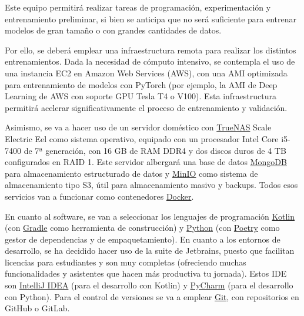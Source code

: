 Este equipo permitirá realizar tareas de programación, experimentación y entrenamiento preliminar, si bien se anticipa que no será suficiente para entrenar modelos de gran tamaño o con grandes cantidades de datos.

Por ello, se deberá emplear una infraestructura remota para realizar los distintos entrenamientos. Dada la necesidad de cómputo intensivo, se contempla el uso de una instancia EC2 en Amazon Web Services (AWS), con una AMI optimizada para entrenamiento de modelos con PyTorch (por ejemplo, la AMI de Deep Learning de AWS con soporte GPU Tesla T4 o V100). Esta infraestructura permitirá acelerar significativamente el proceso de entrenamiento y validación.

Asimismo, se va a hacer uso de un servidor doméstico con \href{https://www.truenas.com/}{TrueNAS} Scale Electric Eel como sistema operativo, equipado con un procesador Intel Core i5-7400 de 7ª generación, con 16 GB de RAM DDR4 y dos discos duros de 4 TB configurados en RAID 1. Este servidor albergará una base de datos \href{https://www.mongodb.com/}{MongoDB} para almacenamiento estructurado de datos y \href{https://min.io/}{MinIO} como sistema de almacenamiento tipo S3, útil para almacenamiento masivo y backups. Todos esos servicios van a funcionar como contenedores \href{https://www.docker.com/}{Docker}.

En cuanto al software, se van a seleccionar los lenguajes de programación \href{https://kotlinlang.org/}{Kotlin} (con \href{https://gradle.org/}{Gradle} como herramienta de construcción) y \href{https://www.python.org/}{Python} (con \href{https://python-poetry.org/}{Poetry} como gestor de dependencias y de empaquetamiento). En cuanto a los entornos de desarrollo, se ha decidido hacer uso de la suite de Jetbrains, puesto que facilitan licencias para estudiantes y son muy completas (ofreciendo muchas funcionalidades y asistentes que hacen más productiva tu jornada). Estos IDE son \href{https://www.jetbrains.com/es-es/idea/}{IntelliJ IDEA} (para el desarrollo con Kotlin) y \href{https://www.jetbrains.com/es-es/pycharm/}{PyCharm} (para el desarrollo con Python). Para el control de versiones se va a emplear \href{https://git-scm.com/}{Git}, con repositorios en GitHub o GitLab.

